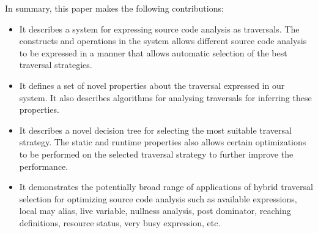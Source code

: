In summary, this paper makes the following contributions:
\begin{itemize}
	\item It describes a system for expressing source code analysis as traversals. The
	constructs and operations in the system allows different source code analysis to
	be expressed in a manner that allows automatic selection of the best traversal
	strategies.
	\item It defines a set of novel properties about the traversal expressed 
	in our system. It also describes algorithms for analysing traversals for inferring 
	these properties. 
	\item It describes a novel decision tree for selecting the most suitable traversal 
	strategy. The static and runtime properties also allows
	certain optimizations to be performed on the selected traversal strategy to
	further improve the performance.
	\item It demonstrates the potentially broad range of applications of
	hybrid traversal selection for optimizing source code analysis such
	as available expressions, local may alias, live variable, nullness
	analysis, post dominator, reaching definitions, resource status,
	very busy expression, etc.
\end{itemize} 

% 
% 


